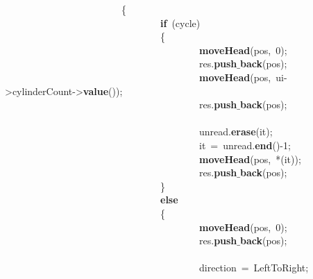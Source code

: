 \mbox{}\ \ \ \ \ \ \ \ \ \ \ \ \ \ \ \ \ \ \ \ \ \ \ \ \{ \\
\mbox{}\ \ \ \ \ \ \ \ \ \ \ \ \ \ \ \ \ \ \ \ \ \ \ \ \ \ \ \ \ \ \ \ \textbf{if}\ (cycle) \\
\mbox{}\ \ \ \ \ \ \ \ \ \ \ \ \ \ \ \ \ \ \ \ \ \ \ \ \ \ \ \ \ \ \ \ \{ \\
\mbox{}\ \ \ \ \ \ \ \ \ \ \ \ \ \ \ \ \ \ \ \ \ \ \ \ \ \ \ \ \ \ \ \ \ \ \ \ \ \ \ \ \textbf{moveHead}(pos,\ 0); \\
\mbox{}\ \ \ \ \ \ \ \ \ \ \ \ \ \ \ \ \ \ \ \ \ \ \ \ \ \ \ \ \ \ \ \ \ \ \ \ \ \ \ \ res.\textbf{push$\_$back}(pos); \\
\mbox{}\ \ \ \ \ \ \ \ \ \ \ \ \ \ \ \ \ \ \ \ \ \ \ \ \ \ \ \ \ \ \ \ \ \ \ \ \ \ \ \ \textbf{moveHead}(pos,\ ui-\textgreater{}cylinderCount-\textgreater{}\textbf{value}()); \\
\mbox{}\ \ \ \ \ \ \ \ \ \ \ \ \ \ \ \ \ \ \ \ \ \ \ \ \ \ \ \ \ \ \ \ \ \ \ \ \ \ \ \ res.\textbf{push$\_$back}(pos); \\
\mbox{} \\
\mbox{}\ \ \ \ \ \ \ \ \ \ \ \ \ \ \ \ \ \ \ \ \ \ \ \ \ \ \ \ \ \ \ \ \ \ \ \ \ \ \ \ unread.\textbf{erase}(it); \\
\mbox{}\ \ \ \ \ \ \ \ \ \ \ \ \ \ \ \ \ \ \ \ \ \ \ \ \ \ \ \ \ \ \ \ \ \ \ \ \ \ \ \ it\ =\ unread.\textbf{end}()-1; \\
\mbox{}\ \ \ \ \ \ \ \ \ \ \ \ \ \ \ \ \ \ \ \ \ \ \ \ \ \ \ \ \ \ \ \ \ \ \ \ \ \ \ \ \textbf{moveHead}(pos,\ *(it)); \\
\mbox{}\ \ \ \ \ \ \ \ \ \ \ \ \ \ \ \ \ \ \ \ \ \ \ \ \ \ \ \ \ \ \ \ \ \ \ \ \ \ \ \ res.\textbf{push$\_$back}(pos); \\
\mbox{}\ \ \ \ \ \ \ \ \ \ \ \ \ \ \ \ \ \ \ \ \ \ \ \ \ \ \ \ \ \ \ \ \} \\
\mbox{}\ \ \ \ \ \ \ \ \ \ \ \ \ \ \ \ \ \ \ \ \ \ \ \ \ \ \ \ \ \ \ \ \textbf{else} \\
\mbox{}\ \ \ \ \ \ \ \ \ \ \ \ \ \ \ \ \ \ \ \ \ \ \ \ \ \ \ \ \ \ \ \ \{ \\
\mbox{}\ \ \ \ \ \ \ \ \ \ \ \ \ \ \ \ \ \ \ \ \ \ \ \ \ \ \ \ \ \ \ \ \ \ \ \ \ \ \ \ \textbf{moveHead}(pos,\ 0); \\
\mbox{}\ \ \ \ \ \ \ \ \ \ \ \ \ \ \ \ \ \ \ \ \ \ \ \ \ \ \ \ \ \ \ \ \ \ \ \ \ \ \ \ res.\textbf{push$\_$back}(pos); \\
\mbox{} \\
\mbox{}\ \ \ \ \ \ \ \ \ \ \ \ \ \ \ \ \ \ \ \ \ \ \ \ \ \ \ \ \ \ \ \ \ \ \ \ \ \ \ \ direction\ =\ LeftToRight; \\
